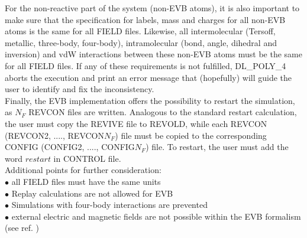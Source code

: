 For the non-reactive part of the system (non-EVB atoms), it is also important to make sure that the specification for labels, mass and charges for all non-EVB atoms is the same for all FIELD files. Likewise, all intermolecular (Tersoff, metallic, three-body, four-body), intramolecular (bond, angle, dihedral and inversion) and vdW interactions between these non-EVB atoms must be the same for all FIELD files. If any of these requirements is not fulfilled, DL\_POLY\_4 aborts the execution and print an error message that (hopefully) will guide the user to identify and fix the inconsistency. \\ 
Finally, the EVB implementation offers the possibility to restart the simulation, as $N_F$ REVCON files are written. Analogous to the standard restart calculation, the user must copy the REVIVE file to REVOLD, while each REVCON (REVCON2, ...., REVCON$N_F$) file must be copied to the corresponding CONFIG (CONFIG2, ...., CONFIG$N_F$) file. To restart, the user must add the word $restart$ in CONTROL file.\\
Additional points for further consideration:\\
$\bullet$ all FIELD files must have the same units\\
$\bullet$ Replay calculations are not allowed for EVB\\
$\bullet$ Simulations with four-body interactions are prevented\\
$\bullet$ external electric and magnetic fields are not possible within the EVB formalism (see ref. \cite{scivetti-evb})

